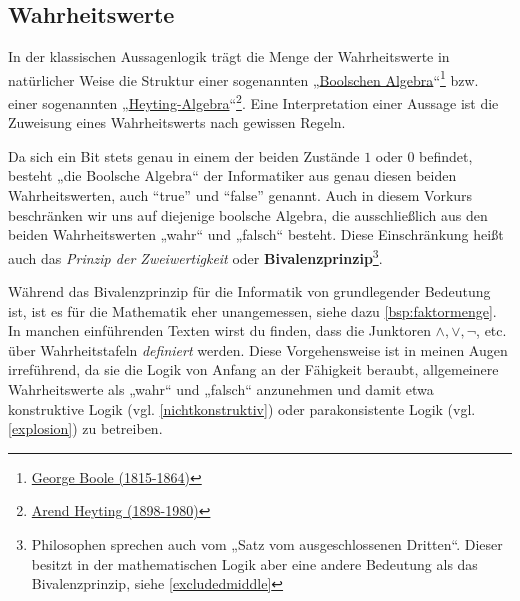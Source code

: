 \subsection*{Wahrheitswerte}


\begin{vorschau}[Bivalenzprinzip] \label{bivalenz} 
    In der klassischen Aussagenlogik trägt die Menge der Wahrheitswerte in natürlicher Weise die Struktur einer sogenannten „\href{https://en.wikipedia.org/wiki/Boolean_algebra_(structure)}{Boolschen Algebra}“\footnote{\href{https://de.wikipedia.org/wiki/George_Boole}{George Boole (1815-1864)}} bzw. einer sogenannten „\href{https://ncatlab.org/nlab/show/Heyting+algebra}{Heyting-Algebra}“\footnote{\href{https://de.wikipedia.org/wiki/Arend_Heyting}{Arend Heyting (1898-1980)}}. Eine Interpretation einer Aussage ist die Zuweisung eines Wahrheitswerts nach gewissen Regeln.
    
    Da sich ein Bit stets genau in einem der beiden Zustände $1$ oder $0$ befindet, besteht „die Boolsche Algebra“ der Informatiker aus genau diesen beiden Wahrheitswerten, auch ``true'' und ``false'' genannt. Auch in diesem Vorkurs beschränken wir uns auf diejenige boolsche Algebra, die ausschließlich aus den beiden Wahrheitswerten „wahr“ und „falsch“ besteht. Diese Einschränkung heißt auch das \emph{Prinzip der Zweiwertigkeit} oder \textbf{Bivalenzprinzip}\footnote{Philosophen sprechen auch vom „Satz vom ausgeschlossenen Dritten“. Dieser besitzt in der mathematischen Logik aber eine andere Bedeutung als das Bivalenzprinzip, siehe \cref{excludedmiddle}}.
    
    Während das Bivalenzprinzip für die Informatik von grundlegender Bedeutung ist, ist es für die Mathematik eher unangemessen, siehe dazu \cref{bsp:faktormenge}. In manchen einführenden Texten wirst du finden, dass die Junktoren $\land,\lor,\neg$, etc. über Wahrheitstafeln \emph{definiert} werden. Diese Vorgehensweise ist in meinen Augen irreführend, da sie die Logik von Anfang an der Fähigkeit beraubt, allgemeinere Wahrheitswerte als „wahr“ und „falsch“ anzunehmen und damit etwa konstruktive Logik (vgl. \cref{nichtkonstruktiv}) oder parakonsistente Logik (vgl. \cref{explosion}) zu betreiben.
\end{vorschau}


\begin{comment}
\begin{bem}[* „Konstante“ Aussagen]
    In der Aussagenlogik kann es bequem sein, Aussagezeichen einzuführen, die für eine Aussage stehen, die stets wahr oder stets falsch sein sollen:
    \begin{itemize}
        \item Mit „$\top$“ (wie englisch ``true'') ist eine Aussage gemeint, die in einem absoluten Sinn immer wahr sein soll.
        \item Mit „$\bot$“ ist eine Aussage gemeint, die in einem absoluten Sinn falsch sein soll, unabhängig davon, wie sie interpretiert wird.
    \end{itemize}
\end{bem}
\end{comment}
 

